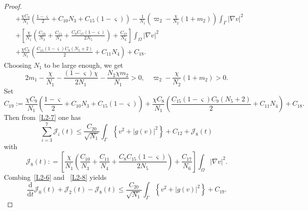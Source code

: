\documentclass{elsarticle}
\begin{document}
\begin{proof}
\begin{equation}
\begin{split}
&+ \frac{\chi C_9}{N_1}\left( \frac{1-\varsigma}{2}+C_{10} N_3 + C_{15}(1-\varsigma)\right)-\frac{1}{N_1} \left(\varpi_2 -\frac{\chi}{N_2}(1+m_2) \right)\int_{\Gamma}|\nabla v|^2\\
& + \left[\frac{\chi}{N_1}\left(\frac{C_{10}}{N_3}+\frac{C_{11}}{N_4} + \frac{C_8 C_{15}(1-\varsigma)}{2N_5}\right) + \frac{C_{17}}{N_6}\right]\int_{\Omega}|\nabla v|^2\\
&+\frac{\chi C_8 }{N_1}\left(\frac{C_{15}(1-\varsigma)C_9(N_5+2)}{2} + C_{11} N_4\right)+C_{18}.
\end{split}
\end{equation}
Choosing $N_1$ to be large enough, we get
\[
2m_1-\frac{\chi}{N_1}-\frac{(1-\varsigma)\chi}{2N_1}- \frac{ N_2\chi m_2}{N_1}>0, \quad \varpi_2 -\frac{\chi}{N_2}(1+m_2)>0.
\]
Set
\[
C_{19}:=\frac{\chi C_9}{N_1}\left( \frac{1-\varsigma}{2}+C_{10} N_3 + C_{15}(1-\varsigma)\right) +\frac{\chi C_8 }{N_1}\left(\frac{C_{15}(1-\varsigma)C_9(N_5+2)}{2} + C_{11} N_4\right) +C_{18}.
\]
Then from~\eqref{L2-7} one has
 \begin{equation}\label{L2-8}
 \sum_{i=3}^7\mathcal{J}_i(t)\leqslant \frac{C_{20}}{\sqrt{N_1}}\int_{\Gamma}\left\{v^2+|g(v)|^2\right\} +C_{12} + \mathcal{J}_{8}(t)
 \end{equation}
 with
 \begin{equation*}
\mathcal{J}_{8}(t) : =\left[\frac{\chi}{N_1}\left(\frac{C_{10}}{N_3}+\frac{C_{11}}{N_4} + \frac{C_8 C_{15}(1-\varsigma)}{2N_5}\right) + \frac{C_{17}}{N_6}\right]\int_{\Omega}|\nabla v|^2.
\end{equation*}
Combing~\eqref{L2-6} and ~\eqref{L2-8} yields
\begin{equation}\label{L2-6_2}
\frac{\mathrm{d}}{\mathrm{d}t}\mathcal{J}_0(t) + \mathcal{J}_2(t)-\mathcal{J}_{8}(t)\leqslant \frac{C_{20}}{\sqrt{N_1}}\int_{\Gamma}\left\{v^2+|g(v)|^2\right\} +C_{19}.
\end{equation}


\end{proof}
\end{document}
